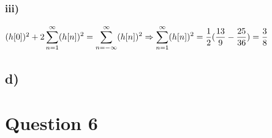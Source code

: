 \documentclass[12pt]{article}
\begin{document}
    \subsubsection*{iii)}
    \begin{math}
    (h[0])^{2} + 2 \displaystyle\sum_{n=1}^{\infty} (h[n])^{2} = \displaystyle\sum_{n=-\infty}^{\infty} (h[n])^{2} \\
    \Rightarrow \displaystyle\sum_{n=1}^{\infty} (h[n])^{2} = \frac{1}{2} (\frac{13}{9} - \frac{25}{36}) = \frac{3}{8}
    \end{math}
    \subsection*{d)}
    \section*{Question 6}
\end{document}
